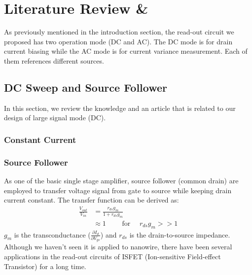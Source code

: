 \chapter{Literature Review \&}
As previously mentioned in the introduction section, the read-out circuit we proposed has two operation mode (DC and AC).
The DC mode is for drain current biasing while the AC mode is for current variance measurement.
Each of them references different sources.

\section{DC Sweep and Source Follower}
In this section, we review the knowledge and an article that is related to our design of large signal mode (DC).

\subsection{Constant Current}


\subsection{Source Follower}
{\color{red}{Fig of source follower}}
As one of the basic single stage amplifier, source follower (common drain) are employed to transfer voltage signal from gate to source while keeping drain current constant.
The transfer function can be derived as:
\setlength{\mathindent}{6.5cm}
\begin{align}
    \frac{V_{out}}{V_{in}} & = \frac{r_{ds}g_m}{1 + r_{ds}g_m} \\    \label{eq:sfTF}
                           & \approx 1 \qquad \text{ for } \quad r_{ds}g_m >> 1
\end{align}
$g_m$ is the transconductance ($\frac{\partial I_d}{\partial V_{gs}}$) and $r_{ds}$ is the drain-to-source impedance.
Although we haven't seen it is applied to nanowire, there have been several applications in the read-out circuits of ISFET (Ion-sensitive Field-effect Transistor)\cite{SF1, SF2} for a long time.

